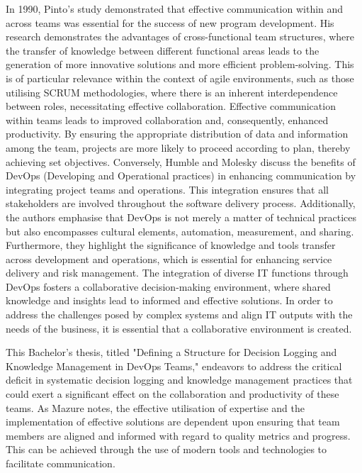 In 1990, Pinto's study \cite{Pinto1990} demonstrated that effective communication within and across teams was essential for the success of new program development. His research demonstrates the advantages of cross-functional team structures, where the transfer of knowledge between different functional areas leads to the generation of more innovative solutions and more efficient problem-solving. This is of particular relevance within the context of agile environments, such as those utilising SCRUM methodologies, where there is an inherent interdependence between roles, necessitating effective collaboration. Effective communication within teams leads to improved collaboration and, consequently, enhanced productivity. By ensuring the appropriate distribution of data and information among the team, projects are more likely to proceed according to plan, thereby achieving set objectives. Conversely, Humble and Molesky \cite{HumbleMolesky2011} discuss the benefits of DevOps (Developing and Operational practices) in enhancing communication by integrating project teams and operations. This integration ensures that all stakeholders are involved throughout the software delivery process. Additionally, the authors emphasise that DevOps is not merely a matter of technical practices but also encompasses cultural elements, automation, measurement, and sharing. Furthermore, they highlight the significance of knowledge and tools transfer across development and operations, which is essential for enhancing service delivery and risk management. The integration of diverse IT functions through DevOps fosters a collaborative decision-making environment, where shared knowledge and insights lead to informed and effective solutions. In order to address the challenges posed by complex systems and align IT outputs with the needs of the business, it is essential that a collaborative environment is created.

This Bachelor's thesis, titled "Defining a Structure for Decision Logging and Knowledge Management in DevOps Teams," endeavors to address the critical deficit in systematic decision logging and knowledge management practices that could exert a significant effect on the collaboration and productivity of these teams. As Mazure \cite{Mazur2023} notes, the effective utilisation of expertise and the implementation of effective solutions are dependent upon ensuring that team members are aligned and informed with regard to quality metrics and progress. This can be achieved through the use of modern tools and technologies to facilitate communication.

